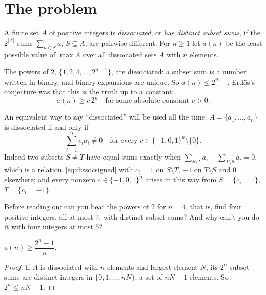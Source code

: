 \section{The problem}

\begin{definition}\label{def:dissociated}
A finite set $A$ of positive integers is \emph{dissociated}, or has \emph{distinct subset sums}, if the $2^{|A|}$ sums
$\sum_{a\in S}a$, $S\subseteq A$, are pairwise different. For $n\ge1$ let $a(n)$ be the least possible value of $\max A$ over all dissociated sets $A$
with $n$ elements.
\end{definition}

The powers of $2$, $\{1,2,4,\dots,2^{n-1}\}$, are dissociated: a subset sum is a number written in binary, and binary
expansions are unique. So $a(n)\le2^{n-1}$. Erd\H os's conjecture was that this is the truth up to a constant:
\[
a(n)\ge c\,2^n\quad\text{for some absolute constant }c>0.
\]

An equivalent way to say ``dissociated'' will be used all the time: $A=\{a_1,\dots,a_n\}$ is dissociated if and only if
\begin{equation}\label{eq:dissocsigned}
\sum_{i=1}^n c_ia_i\neq0\quad\text{for every }c\in\{-1,0,1\}^n\setminus\{0\}.
\end{equation}
Indeed two subsets $S\ne T$ have equal sums exactly when $\sum_{S\setminus T}a_i-\sum_{T\setminus S}a_i=0$, which is a relation~\eqref{eq:dissocsigned} with $c_i=1$ on $S\setminus T$, $-1$ on
$T\setminus S$ and $0$ elsewhere; and every nonzero $c\in\{-1,0,1\}^n$ arises in this way from $S=\{c_i=1\}$, $T=\{c_i=-1\}$.

\begin{think}
Before reading on: can you beat the powers of $2$ for $n=4$, that is, find four positive integers, all at most $7$, with distinct
subset sums? And why can't you do it with four integers at most $5$?
\end{think}

\begin{proposition}\label{prop:counting}
$a(n)\ge\dfrac{2^n-1}n$.
\end{proposition}

\begin{proof}
If $A$ is dissociated with $n$ elements and largest element $N$, its $2^n$ subset sums are distinct integers in $\{0,1,\dots,nN\}$, a set of
$nN+1$ elements. So $2^n\le nN+1$.
\end{proof}

